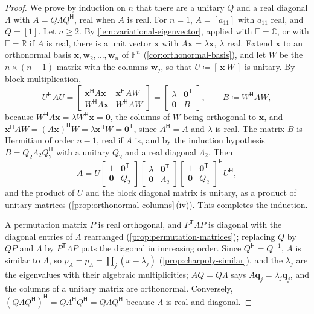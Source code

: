 \begin{proof}
We prove by induction on $n$ that there are a unitary $Q$ and a real diagonal $\Lambda$ with $A=Q\Lambda Q^{\mathsf H}$, real when $A$ is real. For $n=1$, $A=[a_{11}]$ with $a_{11}$ real, and $Q=[1]$. Let $n\ge2$. By \cref{lem:variational-eigenvector}, applied with $\mathbb F=\mathbb C$, or with $\mathbb F=\mathbb R$ if $A$ is real, there is a unit vector $\mathbf x$ with $A\mathbf x=\lambda\mathbf x$, $\lambda$ real. Extend $\mathbf x$ to an orthonormal basis $\mathbf x,\mathbf w_2,\ldots,\mathbf w_n$ of $\mathbb F^n$ (\cref{cor:orthonormal-basis}), and let $W$ be the $n\times(n-1)$ matrix with the columns $\mathbf w_j$, so that $U\coloneqq[\,\mathbf x\ W\,]$ is unitary. By block multiplication,
\[
U^{\mathsf H}AU=\begin{bmatrix}\mathbf x^{\mathsf H}A\mathbf x&\mathbf x^{\mathsf H}AW\\W^{\mathsf H}A\mathbf x&W^{\mathsf H}AW\end{bmatrix}=\begin{bmatrix}\lambda&\mathbf 0^{\mathsf T}\\\mathbf 0&B\end{bmatrix},\qquad B\coloneqq W^{\mathsf H}AW ,
\]
because $W^{\mathsf H}A\mathbf x=\lambda W^{\mathsf H}\mathbf x=\mathbf 0$, the columns of $W$ being orthogonal to $\mathbf x$, and $\mathbf x^{\mathsf H}AW=(A\mathbf x)^{\mathsf H}W=\lambda\mathbf x^{\mathsf H}W=\mathbf 0^{\mathsf T}$, since $A^{\mathsf H}=A$ and $\lambda$ is real. The matrix $B$ is Hermitian of order $n-1$, real if $A$ is, and by the induction hypothesis $B=Q_2\Lambda_2Q_2^{\mathsf H}$ with a unitary $Q_2$ and a real diagonal $\Lambda_2$. Then
\[
A=U\begin{bmatrix}1&\mathbf 0^{\mathsf T}\\\mathbf 0&Q_2\end{bmatrix}\begin{bmatrix}\lambda&\mathbf 0^{\mathsf T}\\\mathbf 0&\Lambda_2\end{bmatrix}\begin{bmatrix}1&\mathbf 0^{\mathsf T}\\\mathbf 0&Q_2\end{bmatrix}^{\mathsf H}U^{\mathsf H},
\]
and the product of $U$ and the block diagonal matrix is unitary, as a product of unitary matrices (\cref{prop:orthonormal-columns}\,(iv)). This completes the induction.

A permutation matrix $P$ is real orthogonal, and $P^{\mathsf T}\Lambda P$ is diagonal with the diagonal entries of $\Lambda$ rearranged (\cref{prop:permutation-matrices}); replacing $Q$ by $QP$ and $\Lambda$ by $P^{\mathsf T}\Lambda P$ puts the diagonal in increasing order. Since $Q^{\mathsf H}=Q^{-1}$, $A$ is similar to $\Lambda$, so $p_A=p_\Lambda=\prod_j(x-\lambda_j)$ (\cref{prop:charpoly-similar}), and the $\lambda_j$ are the eigenvalues with their algebraic multiplicities; $AQ=Q\Lambda$ says $A\mathbf q_j=\lambda_j\mathbf q_j$, and the columns of a unitary matrix are orthonormal. Conversely, $(Q\Lambda Q^{\mathsf H})^{\mathsf H}=Q\Lambda^{\mathsf H}Q^{\mathsf H}=Q\Lambda Q^{\mathsf H}$ because $\Lambda$ is real and diagonal.
\end{proof}

